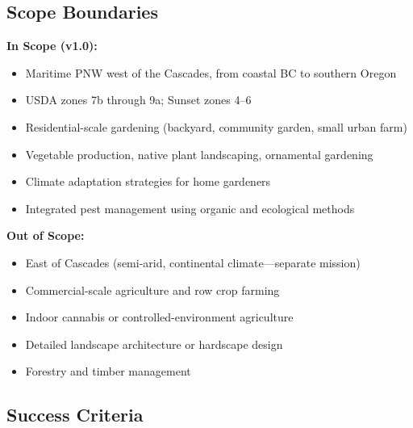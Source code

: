 \documentclass[11pt,letterpaper]{article}
\begin{document}
\subsection{Scope Boundaries}

\textbf{In Scope (v1.0):}
\begin{itemize}[leftmargin=2em]
  \item Maritime PNW west of the Cascades, from coastal BC to southern Oregon
  \item USDA zones 7b through 9a; Sunset zones 4--6
  \item Residential-scale gardening (backyard, community garden, small urban farm)
  \item Vegetable production, native plant landscaping, ornamental gardening
  \item Climate adaptation strategies for home gardeners
  \item Integrated pest management using organic and ecological methods
\end{itemize}

\textbf{Out of Scope:}
\begin{itemize}[leftmargin=2em]
  \item East of Cascades (semi-arid, continental climate---separate mission)
  \item Commercial-scale agriculture and row crop farming
  \item Indoor cannabis or controlled-environment agriculture
  \item Detailed landscape architecture or hardscape design
  \item Forestry and timber management
\end{itemize}

\subsection{Success Criteria}
\end{document}
